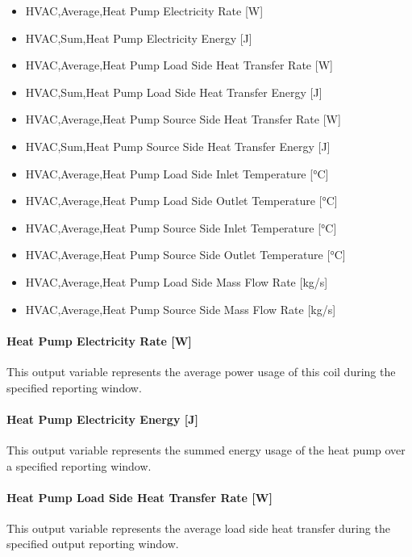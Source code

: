 \begin{itemize}
\item
  HVAC,Average,Heat Pump Electricity Rate {[}W{]}
\item
  HVAC,Sum,Heat Pump Electricity Energy {[}J{]}
\item
  HVAC,Average,Heat Pump Load Side Heat Transfer Rate {[}W{]}
\item
  HVAC,Sum,Heat Pump Load Side Heat Transfer Energy {[}J{]}
\item
  HVAC,Average,Heat Pump Source Side Heat Transfer Rate {[}W{]}
\item
  HVAC,Sum,Heat Pump Source Side Heat Transfer Energy {[}J{]}
\item
  HVAC,Average,Heat Pump Load Side Inlet Temperature {[}°C{]}
\item
  HVAC,Average,Heat Pump Load Side Outlet Temperature {[}°C{]}
\item
  HVAC,Average,Heat Pump Source Side Inlet Temperature {[}°C{]}
\item
  HVAC,Average,Heat Pump Source Side Outlet Temperature {[}°C{]}
\item
  HVAC,Average,Heat Pump Load Side Mass Flow Rate {[}kg/s{]}
\item
  HVAC,Average,Heat Pump Source Side Mass Flow Rate {[}kg/s{]}
\end{itemize}

\paragraph{Heat Pump Electricity Rate {[}W{]}}\label{plhp_eir_outputs_power_usage}

This output variable represents the average power usage of this coil during the specified reporting window.

\paragraph{Heat Pump Electricity Energy {[}J{]}}\label{plhp_eir_outputs_energy_usage}

This output variable represents the summed energy usage of the heat pump over a specified reporting window.

\paragraph{Heat Pump Load Side Heat Transfer Rate {[}W{]}}\label{plhp_eir_outputs_q_load}

This output variable represents the average load side heat transfer during the specified output reporting window.

